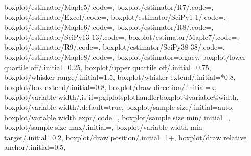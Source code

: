 {	boxplot/estimator/Maple5/.code={\def\pgfplots@boxplot@estimator{R6}},
	boxplot/estimator/R7/.code={\def\pgfplots@boxplot@estimator{R7}},
	boxplot/estimator/Excel/.code={\def\pgfplots@boxplot@estimator{R7}},
	boxplot/estimator/SciPy1-1/.code={\def\pgfplots@boxplot@estimator{R7}},
	boxplot/estimator/Maple6/.code={\def\pgfplots@boxplot@estimator{R7}},
	boxplot/estimator/R8/.code={\def\pgfplots@boxplot@estimator{R8}},
	boxplot/estimator/SciPy13-13/.code={\def\pgfplots@boxplot@estimator{R8}},
	boxplot/estimator/Maple7/.code={\def\pgfplots@boxplot@estimator{R8}},
	boxplot/estimator/R9/.code={\def\pgfplots@boxplot@estimator{R9}},
	boxplot/estimator/SciPy38-38/.code={\def\pgfplots@boxplot@estimator{R9}},
	boxplot/estimator/Maple8/.code={\def\pgfplots@boxplot@estimator{R9}},
	boxplot/estimator=legacy,
	boxplot/lower quartile off/.initial=0.25,
	boxplot/upper quartile off/.initial=0.75,
	boxplot/whisker range/.initial=1.5,
	boxplot/whisker extend/.initial=*0.8,
	boxplot/box extend/.initial=0.8,
	boxplot/draw direction/.initial=x,	
	boxplot/variable width/.is if=pgfplotsplothandlerboxplot@variable@width,
	boxplot/variable width/.default=true,
	boxplot/sample size/.initial=auto,
	boxplot/variable width expr/.code=,
	boxplot/sample size min/.initial=,
	boxplot/sample size max/.initial=,
	boxplot/variable width min target/.initial=0.2,
	boxplot/draw position/.initial=1+\plotnumofactualtype,
	boxplot/draw relative anchor/.initial=0.5,
}
